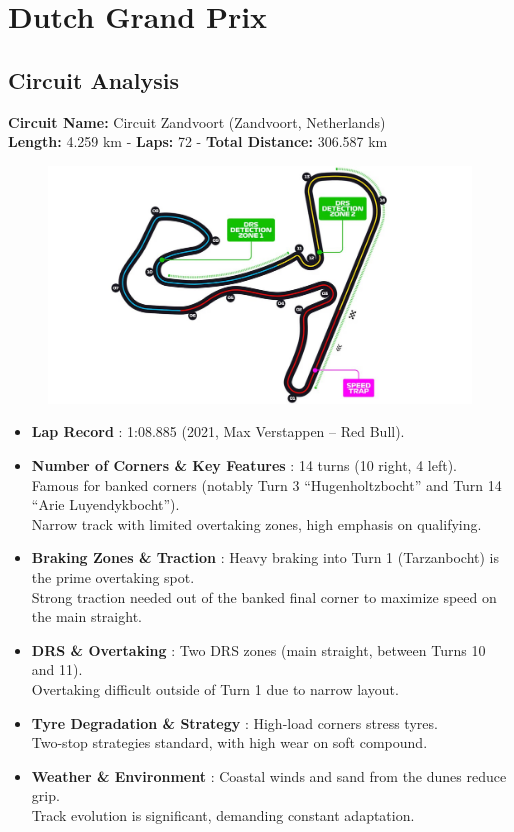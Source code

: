 \section{Dutch Grand Prix}

\subsection{Circuit Analysis}

\textbf{Circuit Name:} Circuit Zandvoort (Zandvoort, Netherlands) \\
\textbf{Length:} 4.259 km - \textbf{Laps:} 72 - \textbf{Total Distance:} 306.587 km

\begin{figure}[H]
    \centering
    \includegraphics[width=0.75\linewidth]{images/15.Netherlands_Circuit.jpg}
\end{figure}

\begin{itemize}
    \item \textbf{Lap Record} : 1:08.885 (2021, Max Verstappen – Red Bull).
    
    \item \textbf{Number of Corners \& Key Features} : 14 turns (10 right, 4 left). \\
    Famous for banked corners (notably Turn 3 “Hugenholtzbocht” and Turn 14 “Arie Luyendykbocht”). \\
    Narrow track with limited overtaking zones, high emphasis on qualifying.
    
    \item \textbf{Braking Zones \& Traction} : Heavy braking into Turn 1 (Tarzanbocht) is the prime overtaking spot. \\
    Strong traction needed out of the banked final corner to maximize speed on the main straight.
    
    \item \textbf{DRS \& Overtaking} : Two DRS zones (main straight, between Turns 10 and 11). \\
    Overtaking difficult outside of Turn 1 due to narrow layout.
    
    \item \textbf{Tyre Degradation \& Strategy} : High-load corners stress tyres. \\
    Two-stop strategies standard, with high wear on soft compound.
    
    \item \textbf{Weather \& Environment} : Coastal winds and sand from the dunes reduce grip. \\
    Track evolution is significant, demanding constant adaptation.
\end{itemize}

